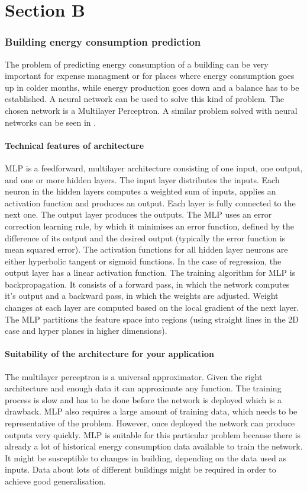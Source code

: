 \documentclass[a4paper, 11pt]{article}
\begin{document}
\part*{Section B}


\section{Building energy consumption prediction}
The problem of predicting energy consumption of a building can be very important for expense managment or for places where energy consumption goes up in colder months, while energy production goes down and a balance has to be established. A neural network can be used to solve this kind of problem. The chosen network is a Multilayer Perceptron. A similar problem solved with neural networks can be seen in \cite{khosravani2016comparison}.
\subsection{Technical features of architecture}
MLP is a feedforward, multilayer architecture consisting of one input, one output, and one or more hidden layers. The input layer distributes the inputs. Each neuron in the hidden layers computes a weighted sum of inputs, applies an activation function and produces an output. Each layer is fully connected to the next one. The output layer produces the outputs. The MLP uses an error correction learning rule, by which it minimises an error function, defined by the difference of its output and the desired output (typically the error function is mean squared error). The activation functions for all hidden layer neurons are either hyperbolic tangent or sigmoid functions. In the case of regression, the output layer has a linear activation function. The training algorithm for MLP is backpropagation. It consists of a forward pass, in which the network computes it's output and a backward pass, in which the weights are adjusted. Weight changes at each layer are computed based on the local gradient of the next layer. The MLP partitions the feature space into regions (using straight lines in the 2D case and hyper planes in higher dimensions). 
\subsection{Suitability of the architecture for your application}
The multilayer perceptron is a universal approximator. Given the right architecture and enough data it can approximate any function. The training process is slow and has to be done before the network is deployed which is a drawback. MLP also requires a large amount of training data, which needs to be representative of the problem. However, once deployed the network can produce outputs very quickly. MLP is suitable for this particular problem because there is already a lot of historical energy consumption data available to train the network. It might be susceptible to changes in building, depending on the data used as inputs. Data about lots of different buildings might be required in order to achieve good generalisation.
\end{document}
